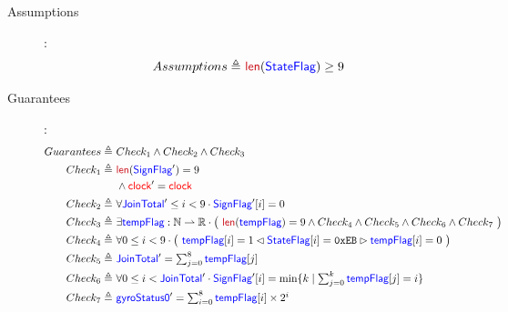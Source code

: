 \documentclass[fleqn,a4paper]{article}
\newcommand\Var[1]{\textcolor{blue}{\textsf{#1}}}
\newcommand\syntax[1]{\textcolor[RGB]{202,12,22}{\textsf{#1}}}
\newcommand\clock{\textcolor{red}{\textsf{clock}}}
\newcommand\definedby{\triangleq}
\begin{document}
\begin{description}
\item[Assumptions]:
\begin{align*}
Assumptions \definedby \
& \syntax{len}(\Var{StateFlag}) \geq 9
\end{align*}

\item[Guarantees]:
\begin{align*}
Guarantees \definedby \
& Check_1 \wedge Check_2 \wedge Check_3 \\
Check_1 \definedby \
& \syntax{len}(\Var{SignFlag}') = 9 \\
& \wedge \clock'=\clock \\
Check_2 \definedby \
& \forall \Var{JoinTotal}' \leq i < 9 \cdot \Var{SignFlag}'[i] = 0 \\
Check_3 \definedby \
& \exists \Var{tempFlag} : \mathbb{N} \rightharpoonup \mathbb{R} \cdot
\big{(} \
\syntax{len}(\Var{tempFlag}) = 9 \wedge Check_4 \wedge Check_5 \wedge Check_6 \wedge Check_7 \
\big{)} \\
Check_4 \definedby \
& \forall 0 \leq i < 9 \cdot \big{(} \ \Var{tempFlag}[i] = 1 \lhd \Var{StateFlag}[i] = \texttt{0xEB} \rhd \Var{tempFlag}[i] = 0 \ \big{)} \\
Check_5 \definedby \
& \Var{JoinTotal}' = \textstyle \sum_{j=0}^8 \Var{tempFlag}[j] \\
Check_6 \definedby \
& \forall 0 \leq i < \Var{JoinTotal}' \cdot \Var{SignFlag}'[i] = \min \{ k \mid \textstyle \sum_{j=0}^k \Var{tempFlag}[j] = i \} \\
Check_7 \definedby \
& \Var{gyroStatus0}' = \textstyle \sum_{i=0}^8 \Var{tempFlag}[i] \times 2^i
\end{align*}

\end{description}
\end{document}
